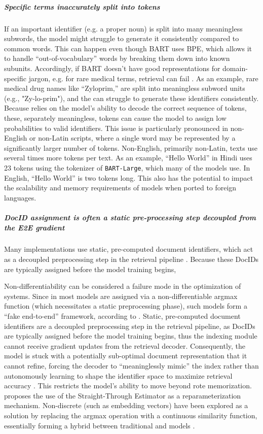 \subparagraph{Specific terms inaccurately split into tokens}
If an important identifier (e.g. a proper noun) is split into many meaningless subwords, the model might struggle to generate it consistently compared to common words. This can happen even though BART uses BPE, which allows it to handle ``out-of-vocabulary'' words by breaking them down into known subunits. Accordingly, if BART doesn't have good representations for domain-specific jargon, e.g. for rare medical terms, retrieval can fail \cite{herold2025vocabulary}. As an example, rare medical drug names like ``Zyloprim,'' are split into meaningless subword units (e.g., "Zy-lo-prim"), and the  can struggle to generate these identifiers consistently. Because  relies on the model’s ability to decode the correct sequence of tokens, these, separately meaningless, tokens can cause the model to assign low probabilities to valid identifiers. This issue is particularly pronounced in non-English or non-Latin scripts, where a single word may be represented by a significantly larger number of tokens. Non-English, primarily non-Latin, texts use several times more tokens per text. As an example, ``Hello World'' in Hindi uses 23 tokens using the tokenizer of \texttt{BART-Large}, which many of the models use. In English, ``Hello World'' is two tokens long. This also has the potential to impact the scalability and memory requirements of  models when ported to foreign languages.

\subparagraph{DocID assignment is often a static pre-processing step decoupled from the E2E gradient}
Many  implementations use static, pre-computed document identifiers, which act as a decoupled preprocessing step in the retrieval pipeline \cite{tianchi-yang-auto-search}. Because these DocIDs are typically assigned before the model training begins, 

Non-differentiability can be considered a failure mode in the optimization of  systems. Since in most models 
 are assigned via a non-differentiable argmax function (which necessitates a static preprocessing phase), 
such models form a ``fake end-to-end'' framework, according to \citet{tianchi-yang-auto-search}. Static, pre-computed document identifiers are a decoupled preprocessing step in the retrieval pipeline, as DocIDs are typically assigned before the model training begins, thus the indexing module cannot receive gradient updates from the retrieval decoder. Consequently, the model is stuck with a potentially sub-optimal document representation that it cannot refine, forcing the decoder to ``meaninglessly mimic'' the index rather than autonomously learning to shape the identifier space to maximize retrieval accuracy \cite{tianchi-yang-auto-search}. This restricts the model’s ability to move beyond rote memorization. \citet{tianchi-yang-auto-search} proposes the use of the Straight-Through Estimator \cite{bengio-ste} as a reparameterization mechanism. Non-discrete  (such as embedding vectors) have been explored as a solution by replacing the argmax operation with a continuous similarity function, essentially forming a hybrid between traditional  and  models \cite{zihan-wang-novo, thong-nguyen-generative-retrieval, peiwen-yuan-generative-dense}.

